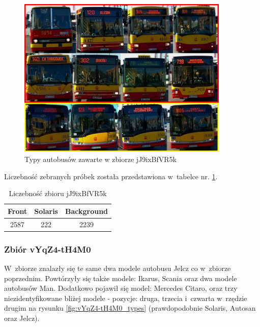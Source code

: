 \begin{figure}[!h]
    \centering
    \includegraphics[width=0.9\textwidth]{img/exp_trainig_data_jJ9}
    \caption{Typy autobusów zawarte w zbiorze jJ9ixBfVR5k}
    \label{fig:jJ9ixBfVR5k_types}
\end{figure}

Liczebność zebranych próbek została przedstawiona w~tabelce nr. 
\ref{tab:jJ9ixBfVR5k_count}.

\begin{table}[!h]
    \centering
    \begin{tabular}{c|c|c}
        Front   & Solaris   & Background \\ \hline
        2587    & 222       & 2239
    \end{tabular}
    \caption{Liczebność zbioru jJ9ixBfVR5k}
    \label{tab:jJ9ixBfVR5k_count}
\end{table}

\newpage

\subsubsection{Zbiór vYqZ4-tH4M0}

W~zbiorze znalazły się te same dwa modele autobusu Jelcz co w~zbiorze
poprzednim. Powtórzyły się także modele: Ikarus, Scania oraz dwa modele
autobusów Man. Dodatkowo pojawił się model: Mercedes Citaro, oraz trzy 
niezidentyfikowane bliżej modele - pozycje: druga, trzecia i~czwarta 
w~rzędzie drugim na rysunku \ref{fig:vYqZ4-tH4M0_types} 
(prawdopodobnie Solaris, Autosan oraz Jelcz).

